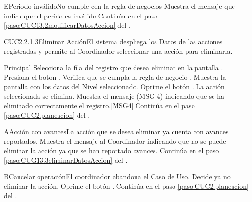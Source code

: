 		\begin{UCtrayectoriaA}{E}{Periodo inválido}{No cumple con la regla de negocios }
			\UCpaso Muestra el mensaje  que indica que el perido es inválido
			\UCpaso Continúa en el paso \ref{paso:CUC13.2modificarDatosAccion} del .
		\end{UCtrayectoriaA}

	\begin{UseCase}{CUC2.2.1.3}{Eliminar Acción}{El sistema despliega los Datos de las acciones registradas y permite al Coordinador seleccionar una  acción para eliminarla.}
	\end{UseCase}

	\begin{UCtrayectoria}{Principal}
			\UCpaso[\UCactor] Selecciona la fila del registro que desea eliminar en la pantalla .
			\UCpaso[\UCactor] Presiona el boton .
			\UCpaso Verifica que se cumpla la regla de negocio . 
			\UCpaso Muestra la pantalla  con los datos del Nivel seleccionado. \label{paso:CUG13.3eliminarDatosAccion}
			\UCpaso [\UCactor] Oprime el botón . 
			\UCpaso La acción seleccionada se elimina.
			\UCpaso Muestra el mensaje (MSG-4) indicando que se ha eliminado correctamente el registro.\ref{MSG4}
			\UCpaso Continúa en el paso \ref{paso:CUC2.planeacion} del .
	\end{UCtrayectoria}


		\begin{UCtrayectoriaA}{A}{Acción con avances}{La acción que se desea eliminar ya cuenta con avances reportados.}
			\UCpaso Muestra el mensaje  al Coordinador indicando que no se puede eliminar la acción ya que se han reportado avances.
			\UCpaso Continúa en el paso \ref{paso:CUG13.3eliminarDatosAccion} del .
		\end{UCtrayectoriaA}
		\begin{UCtrayectoriaA}{B}{Cancelar operación}{El coordinador abandona el Caso de Uso.}
			\UCpaso[\UCactor] Decide ya no eliminar la acción.
			\UCpaso[\UCactor] Oprime el botón .
			\UCpaso Continúa en el paso \ref{paso:CUC2.planeacion} del .
		\end{UCtrayectoriaA}
		
